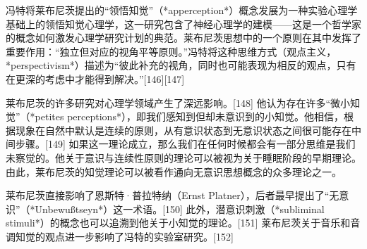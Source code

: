 冯特将莱布尼茨提出的“领悟知觉”（*apperception*）概念发展为一种实验心理学基础上的领悟知觉心理学，这一研究包含了神经心理学的建模——这是一个哲学家的概念如何激发心理学研究计划的典范。莱布尼茨思想中的一个原则在其中发挥了重要作用：“独立但对应的视角平等原则。”冯特将这种思维方式（观点主义，*perspectivism*）描述为“彼此补充的视角，同时也可能表现为相反的观点，只有在更深的考虑中才能得到解决。”[146][147]  

莱布尼茨的许多研究对心理学领域产生了深远影响。[148] 他认为存在许多“微小知觉”（*petites perceptions*），即我们感知到但却未意识到的小知觉。他相信，根据现象在自然中默认是连续的原则，从有意识状态到无意识状态之间很可能存在中间步骤。[149] 如果这一理论成立，那么我们在任何时候都会有一部分思维是我们未察觉的。他关于意识与连续性原则的理论可以被视为关于睡眠阶段的早期理论。由此，莱布尼茨的知觉理论可以被看作通向无意识思想概念的众多理论之一。  

莱布尼茨直接影响了恩斯特·普拉特纳（Ernst Platner），后者最早提出了“无意识”（*Unbewußtseyn*）这一术语。[150] 此外，潜意识刺激（*subliminal stimuli*）的概念也可以追溯到他关于小知觉的理论。[151] 莱布尼茨关于音乐和音调知觉的观点进一步影响了冯特的实验室研究。[152]